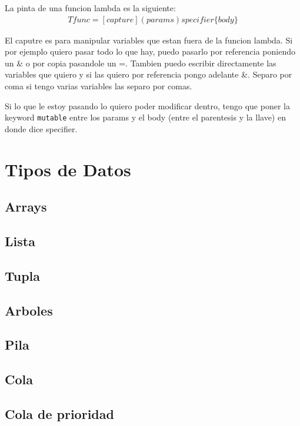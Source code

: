 \documentclass[11pt]{article}
\begin{document}
La pinta de una funcion lambda es la siguiente:
\begin{align*}
    T func = [\textit{capture}](\textit{params})\textit{specifier}\{\textit{body}\}
\end{align*}

El caputre es para manipular variables que estan fuera de la funcion lambda.
Si por ejemplo quiero pasar todo lo que hay, puedo pasarlo por referencia poniendo
un \& o por copia pasandole un =.
Tambien puedo escribir directamente las variables que quiero y si las quiero por
referencia pongo adelante \&.
Separo por coma si tengo varias variables las separo por comas.

Si lo que le estoy pasando lo quiero poder modificar dentro, tengo que poner
la keyword \texttt{mutable} entre los params y el body (entre el parentesis y la
llave) en donde dice specifier.

\section{Tipos de Datos}
\subsection{Arrays}

\subsection{Lista}
\subsection{Tupla}
\subsection{Arboles}

\subsection{Pila}
\subsection{Cola}
\subsection{Cola de prioridad}

\end{document}
